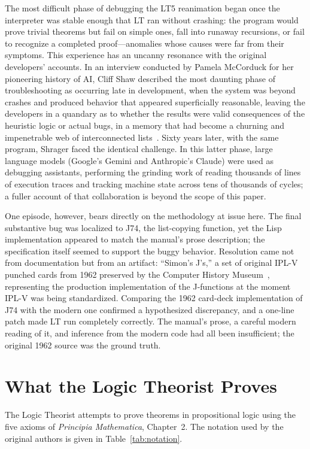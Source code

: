 \documentclass[journal]{IEEEtran}
\begin{document}
The most difficult phase of debugging the LT5 reanimation began once
the interpreter was stable enough that LT ran without crashing: the
program would prove trivial theorems but fail on simple ones, fall
into runaway recursions, or fail to recognize a completed
proof---anomalies whose causes were far from their symptoms. This
experience has an uncanny resonance with the original developers'
accounts. In an interview conducted by Pamela McCorduck for her
pioneering history of AI, Cliff Shaw described the most daunting phase
of troubleshooting as occurring late in development, when the system
was beyond crashes and produced behavior that appeared superficially
reasonable, leaving the developers in a quandary as to whether the
results were valid consequences of the heuristic logic or actual
bugs, in a memory that had become a churning and impenetrable web of
interconnected lists~\cite{cmuarchiveshawinterview}. Sixty years
later, with the same program, Shrager faced the identical challenge.
In this latter phase, large language models (Google's Gemini and
Anthropic's Claude) were used as debugging assistants, performing the
grinding work of reading thousands of lines of execution traces and
tracking machine state across tens of thousands of cycles; a fuller
account of that collaboration is beyond the scope of this paper.

One episode, however, bears directly on the methodology at issue
here. The final substantive bug was localized to J74, the list-copying
function, yet the Lisp implementation appeared to match the manual's
prose description; the specification itself seemed to support the
buggy behavior. Resolution came not from documentation but from an
artifact: ``Simon's J's,'' a set of original IPL-V punched cards from
1962 preserved by the Computer History
Museum~\cite{bochannek2012simonsjs}, representing the production
implementation of the J-functions at the moment IPL-V was being
standardized. Comparing the 1962 card-deck implementation of J74 with
the modern one confirmed a hypothesized discrepancy, and a one-line
patch made LT run completely correctly. The manual's prose, a careful
modern reading of it, and inference from the modern code had all been
insufficient; the original 1962 source was the ground truth.

\section{What the Logic Theorist Proves}
\label{sec:results}

The Logic Theorist attempts to prove theorems in propositional logic
using the five axioms of \textit{Principia Mathematica}, Chapter~2.
The notation used by the original authors is given in
Table~\ref{tab:notation}.
\end{document}
